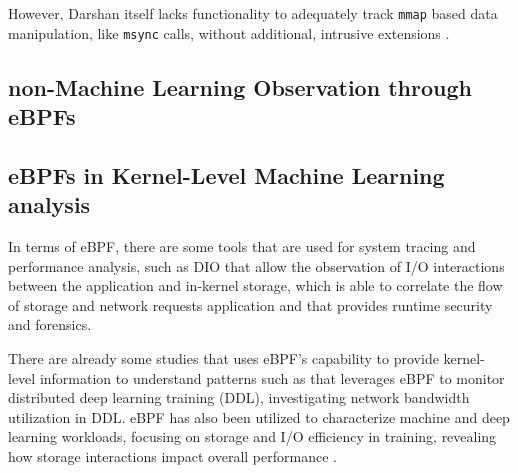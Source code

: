 \documentclass[conference]{IEEEtran}
\begin{document}
However, Darshan itself lacks functionality to adequately track \texttt{mmap} based data manipulation, like \texttt{msync} calls, without additional, intrusive extensions \cite{tfdarshan}.



\subsection{non-Machine Learning Observation through eBPFs}

\subsection{eBPFs in Kernel-Level Machine Learning analysis}


In terms of eBPF, there are some tools that are used for system tracing and performance analysis,
such as DIO \cite{DIO} that allow the observation of I/O interactions between the application and in-kernel storage,
\cite{CAT} which is able to correlate the flow of storage and network requests application and \cite{tracee} that provides runtime security and forensics.  

There are already some studies that uses eBPF's capability to provide kernel-level information to understand patterns such as \cite{eBPFDLNetwork} that
leverages eBPF to monitor distributed deep learning training (DDL), investigating network bandwidth utilization in DDL.
eBPF has also been utilized to characterize machine and deep learning workloads, focusing on storage and I/O efficiency in training,
revealing how storage interactions impact overall performance \cite{OanaDL, OanaML}.
\end{document}
